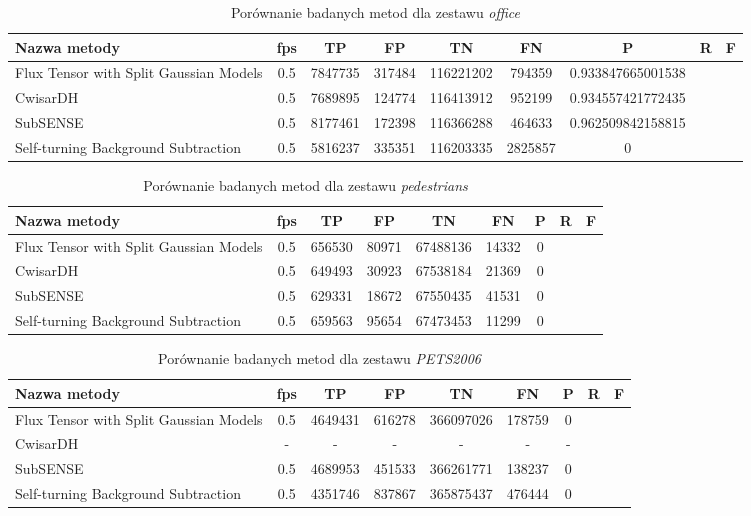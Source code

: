\begin{table}[h]
\caption{Porównanie badanych metod dla zestawu \textit{office}}
\label{tab:resultsOffice}
\centering
\begin{tabular}{|l*{8}{|c}|}
  \hline 
  \textbf{Nazwa metody} & \textbf{fps} & \textbf{TP} & \textbf{FP} & \textbf{TN} & \textbf{FN} & \textbf{P} & \textbf{R} & \textbf{F}\\
  \hline
  Flux Tensor with Split Gaussian Models & 0.5 & 7847735 & 317484 & 116221202 & 794359 & 0.933847665001538 \\
  \hline
  CwisarDH & 0.5 & 7689895 & 124774 & 116413912 & 952199 & 0.934557421772435 \\
  \hline
  SubSENSE & 0.5 & 8177461 & 172398 & 116366288 & 464633 & 0.962509842158815 \\
  \hline
  Self-turning Background Subtraction & 0.5 & 5816237 & 335351 & 116203335 & 2825857 & 0 \\
  \hline
\end{tabular}
\end{table}

\begin{table}[h]
\caption{Porównanie badanych metod dla zestawu \textit{pedestrians}}
\label{tab:resultsPedestrians}
\centering
\begin{tabular}{|l*{8}{|c}|}
  \hline 
  \textbf{Nazwa metody} & \textbf{fps} & \textbf{TP} & \textbf{FP} & \textbf{TN} & \textbf{FN} & \textbf{P} & \textbf{R} & \textbf{F}\\
  \hline
  Flux Tensor with Split Gaussian Models & 0.5 & 656530 & 80971 & 67488136 & 14332 & 0 \\
  \hline
  CwisarDH & 0.5 & 649493 & 30923 & 67538184 & 21369 & 0 \\
  \hline
  SubSENSE & 0.5 & 629331 & 18672 & 67550435 & 41531 & 0 \\
  \hline
  Self-turning Background Subtraction & 0.5 & 659563 & 95654 & 67473453 & 11299 & 0 \\
  \hline
\end{tabular}
\end{table}

\begin{table}[h]
\caption{Porównanie badanych metod dla zestawu \textit{PETS2006}}
\label{tab:resultsPETS2006}
\centering
\begin{tabular}{|l*{8}{|c}|}
  \hline 
  \textbf{Nazwa metody} & \textbf{fps} & \textbf{TP} & \textbf{FP} & \textbf{TN} & \textbf{FN} & \textbf{P} & \textbf{R} & \textbf{F}\\
  \hline
  Flux Tensor with Split Gaussian Models & 0.5 & 4649431 & 616278 & 366097026 & 178759 & 0 \\
  \hline
  CwisarDH & - & - & - & - & - & - \\
  \hline
  SubSENSE & 0.5 & 4689953 & 451533 & 366261771 & 138237 & 0 \\
  \hline
  Self-turning Background Subtraction & 0.5 & 4351746 & 837867 & 365875437 & 476444 & 0 \\
  \hline
\end{tabular}
\end{table}



